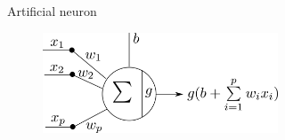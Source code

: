 \documentclass[xcolor=pdftex,dvipsnames,table,mathserif]{beamer}
\begin{document}
\begin{frame}{Artificial neuron}

    \begin{figure}
      \includegraphics[height=3cm]{neurone_representation_compacte}
    \end{figure}

\end{frame}


\end{document}
